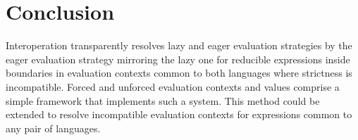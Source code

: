 \chapter{Conclusion}

Interoperation transparently resolves lazy and eager evaluation strategies by the eager evaluation strategy mirroring the lazy one for reducible expressions inside boundaries in evaluation contexts common to both languages where strictness is incompatible. Forced and unforced evaluation contexts and values comprise a simple framework that implements such a system. This method could be extended to resolve incompatible evaluation contexts for expressions common to any pair of languages.